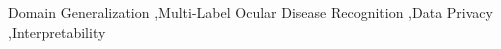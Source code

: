 \documentclass[a4paper,fleqn]{cas-sc}
\begin{document}
\begin{keywords}
\raggedright
Domain Generalization \sep Multi-Label Ocular Disease Recognition \sep Data Privacy \sep Interpretability
\end{keywords}

\maketitle





\FloatBarrier



\end{document}
